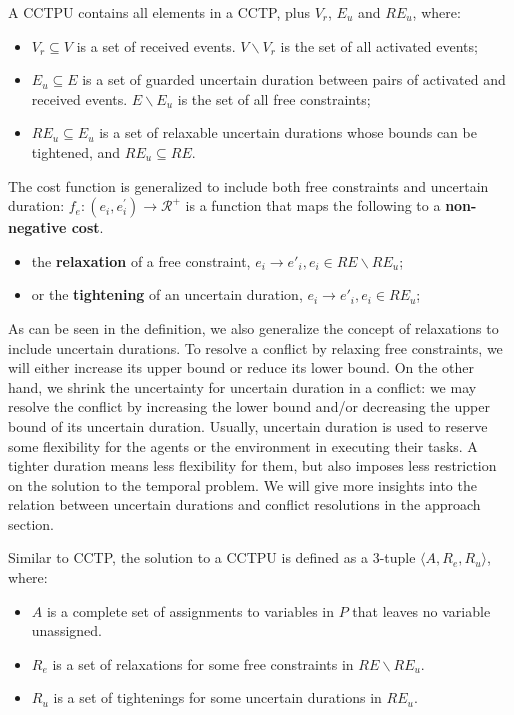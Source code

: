 \documentclass[jair,twoside,11pt,theapa]{article}
\begin{document}
\begin{mydef}
\label{def:CCTPU}
	A CCTPU contains all elements in a CCTP, plus $V_r$, $E_u$ and $RE_u$, where:
	
	\begin{itemize}
		\item $V_r\subseteq V$ is a set of received events. $V\backslash V_r$ is the
set of all activated events; 
		\item $E_u\subseteq E$ is a set of guarded uncertain duration between pairs of
activated and received events. $E\backslash E_u$ is the set of all free constraints;
		\item $RE_u\subseteq E_u$ is a set of relaxable uncertain durations whose
		bounds can be tightened, and $RE_u\subseteq RE$.
	\end{itemize}
	
	The cost function is generalized to include both free constraints and uncertain
duration: $f_e:(e_i,e_i^{\prime})\rightarrow \mathcal{R}^{+}$ is a
	function that maps the following to a \textbf{non-negative cost}.
	\begin{itemize}
		\item the \textbf{relaxation} of a free constraint, $e_i\rightarrow
		e'_i,e_i\in RE\backslash RE_u$;
		\item or the \textbf{tightening} of an uncertain duration, $e_i\rightarrow
		e'_i,e_i\in RE_u$;
	\end{itemize}
	
\end{mydef}

As can be seen in the definition, we also generalize the concept of relaxations to include uncertain durations. To resolve a conflict by relaxing free constraints, we will either increase its upper bound or reduce its lower bound. On the other hand, we shrink the uncertainty for uncertain duration in a conflict: we may resolve the
conflict by increasing the lower bound and/or decreasing the upper bound of its
uncertain duration. Usually, uncertain duration is used to reserve some
flexibility for the agents or the environment in executing their tasks. A
tighter duration means less flexibility for them, but also imposes less
restriction on the solution to the temporal problem. We will give more insights
into the relation between uncertain durations and conflict resolutions in the
approach section. 


Similar to CCTP, the solution to a CCTPU is defined as a 3-tuple $\langle A,R_e,R_u\rangle$, where:
\begin{itemize}
	\item $A$ is a complete set of assignments to variables in $P$ that leaves
	no variable unassigned.
	\item $R_e$ is a set of relaxations for some free constraints
	in $RE\backslash RE_u$.
	\item $R_u$ is a set of tightenings for some uncertain durations in $RE_u$.
\end{itemize}
\end{document}
